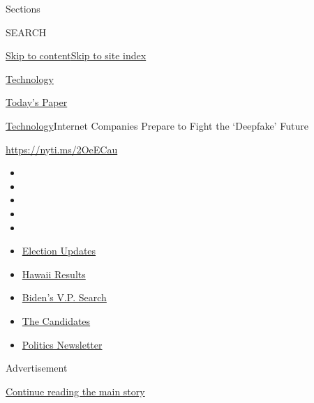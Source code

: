 Sections

SEARCH

\protect\hyperlink{site-content}{Skip to
content}\protect\hyperlink{site-index}{Skip to site index}

\href{https://www.nytimes.com/section/technology}{Technology}

\href{https://myaccount.nytimes.com/auth/login?response_type=cookie\&client_id=vi}{}

\href{https://www.nytimes.com/section/todayspaper}{Today's Paper}

\href{/section/technology}{Technology}\textbar{}Internet Companies
Prepare to Fight the `Deepfake' Future

\href{https://nyti.ms/2OeECau}{https://nyti.ms/2OeECau}

\begin{itemize}
\item
\item
\item
\item
\item
\end{itemize}

\begin{itemize}
\item
  \href{https://www.nytimes.com/2020/08/07/us/elections/biden-vs-trump.html?action=click\&pgtype=Article\&state=default\&region=TOP_BANNER\&context=storylines_menu}{Election
  Updates}
\item
  \href{https://www.nytimes.com/interactive/2020/08/08/us/elections/results-hawaii-primary-elections.html?action=click\&pgtype=Article\&state=default\&region=TOP_BANNER\&context=storylines_menu}{Hawaii
  Results}
\item
  \href{https://www.nytimes.com/article/biden-vice-president-2020.html?action=click\&pgtype=Article\&state=default\&region=TOP_BANNER\&context=storylines_menu}{Biden's
  V.P. Search}
\item
  \href{https://www.nytimes.com/interactive/2019/us/politics/2020-presidential-candidates.html?action=click\&pgtype=Article\&state=default\&region=TOP_BANNER\&context=storylines_menu}{The
  Candidates}
\item
  \href{https://www.nytimes.com/newsletters/politics?action=click\&pgtype=Article\&state=default\&region=TOP_BANNER\&context=storylines_menu}{Politics
  Newsletter}
\end{itemize}

Advertisement

\protect\hyperlink{after-top}{Continue reading the main story}


